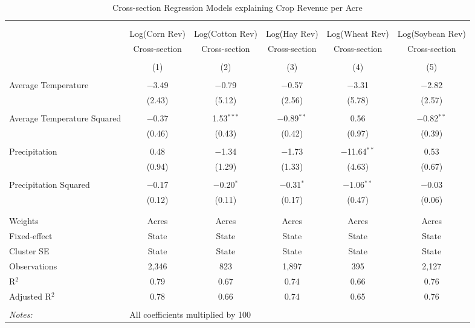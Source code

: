 \documentclass[10pt]{article}
\begin{document}
\begin{table}[!htbp] \centering 
  \caption{Cross-section Regression Models explaining Crop Revenue per Acre} 
  \label{} 
\footnotesize 
\begin{tabular}{@{\extracolsep{5pt}}lccccc} 
\\[-1.8ex]\hline 
\hline \\[-1.8ex] 
\\[-1.8ex] & Log(Corn Rev) & Log(Cotton Rev) & Log(Hay Rev) & Log(Wheat Rev) & Log(Soybean Rev) \\ 
 & Cross-section & Cross-section & Cross-section & Cross-section & Cross-section \\ 
\\[-1.8ex] & (1) & (2) & (3) & (4) & (5)\\ 
\hline \\[-1.8ex] 
 Average Temperature & $-$3.49 & $-$0.79 & $-$0.57 & $-$3.31 & $-$2.82 \\ 
  & (2.43) & (5.12) & (2.56) & (5.78) & (2.57) \\ 
  & & & & & \\ 
 Average Temperature Squared & $-$0.37 & 1.53$^{***}$ & $-$0.89$^{**}$ & 0.56 & $-$0.82$^{**}$ \\ 
  & (0.46) & (0.43) & (0.42) & (0.97) & (0.39) \\ 
  & & & & & \\ 
 Precipitation & 0.48 & $-$1.34 & $-$1.73 & $-$11.64$^{**}$ & 0.53 \\ 
  & (0.94) & (1.29) & (1.33) & (4.63) & (0.67) \\ 
  & & & & & \\ 
 Precipitation Squared & $-$0.17 & $-$0.20$^{*}$ & $-$0.31$^{*}$ & $-$1.06$^{**}$ & $-$0.03 \\ 
  & (0.12) & (0.11) & (0.17) & (0.47) & (0.06) \\ 
  & & & & & \\ 
\hline \\[-1.8ex] 
Weights & Acres & Acres & Acres & Acres & Acres \\ 
Fixed-effect & State & State & State & State & State \\ 
Cluster SE & State & State & State & State & State \\ 
Observations & 2,346 & 823 & 1,897 & 395 & 2,127 \\ 
R$^{2}$ & 0.79 & 0.67 & 0.74 & 0.66 & 0.76 \\ 
Adjusted R$^{2}$ & 0.78 & 0.66 & 0.74 & 0.65 & 0.76 \\ 
\hline 
\hline \\[-1.8ex] 
\textit{Notes:} & \multicolumn{5}{l}{All coefficients multiplied by 100} \\ 
\end{tabular} 
\end{table} 
\end{document}
